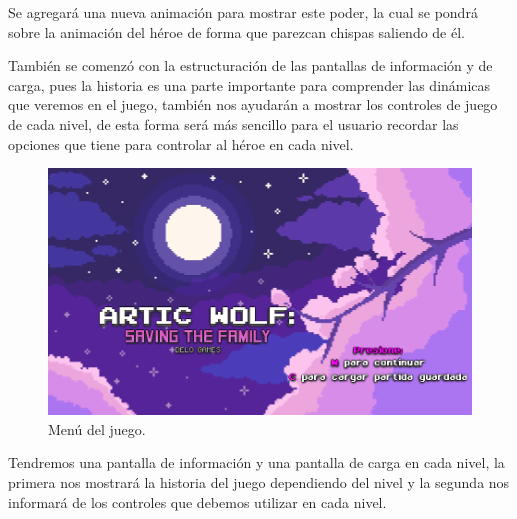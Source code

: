 \documentclass{article}
\begin{document}
Se agregará una nueva animación para mostrar este poder, la cual se pondrá sobre la animación del héroe de forma que parezcan chispas saliendo de él. 

También se comenzó con la estructuración de las pantallas de información y de carga, pues la historia es una parte importante para comprender las dinámicas que veremos en el juego, también nos ayudarán a mostrar los controles de juego de cada nivel, de esta forma será más sencillo para el usuario recordar las opciones que tiene para controlar al héroe en cada nivel.

\begin{figure}[h]
\includegraphics[scale=0.6]{Images/menu.png}
\centering
\caption{Menú del juego.}
\label{fig:menu}
\end{figure}

\newpage
Tendremos una pantalla de información y una pantalla de carga en cada nivel, la primera nos mostrará la historia del juego dependiendo del nivel y la segunda nos informará de los controles que debemos utilizar en cada nivel.
\end{document}
